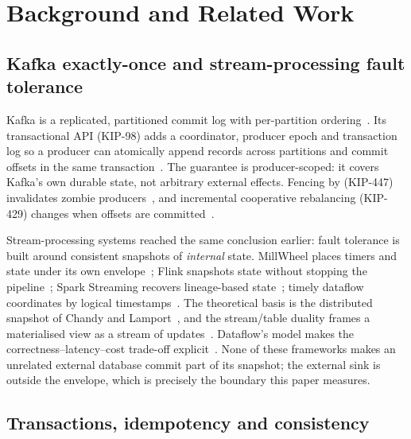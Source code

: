 \section{Background and Related Work}
\label{sec:related}

\subsection{Kafka exactly-once and stream-processing fault tolerance}
\label{sec:rel-eos}

Kafka is a replicated, partitioned commit log with per-partition ordering~\cite{kafka2015}. Its
transactional API (KIP-98) adds a coordinator, producer epoch and transaction log so a producer
can atomically append records across partitions and commit offsets in the same
transaction~\cite{kip98,kafka-design}. The guarantee is producer-scoped: it covers Kafka's own
durable state, not arbitrary external effects. Fencing by  (KIP-447)
invalidates zombie producers~\cite{kip447}, and incremental cooperative rebalancing (KIP-429)
changes when offsets are committed~\cite{kip429}.

Stream-processing systems reached the same conclusion earlier: fault tolerance is built
around consistent snapshots of \emph{internal} state. MillWheel places timers and state
under its own envelope~\cite{millwheel2013}; Flink snapshots state without stopping the
pipeline~\cite{flink2017}; Spark Streaming recovers lineage-based
state~\cite{dstreams2013}; timely dataflow coordinates by logical
timestamps~\cite{naiad2013}. The theoretical basis is the distributed snapshot of Chandy
and Lamport~\cite{chandy1985}, and the stream/table duality frames a materialised view as
a stream of updates~\cite{sax2018}. Dataflow's model makes the correctness--latency--cost
trade-off explicit~\cite{dataflow2015}. None of these frameworks makes an unrelated
external database commit part of its snapshot; the external sink is outside the envelope,
which is precisely the boundary this paper measures.

\subsection{Transactions, idempotency and consistency}
\label{sec:rel-txn}

